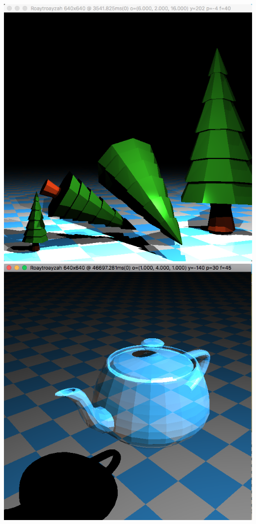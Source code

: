 \includegraphics[width=\textwidth]{img/fallingTrees}
\includegraphics[width=\textwidth]{img/ghostTeapot}
